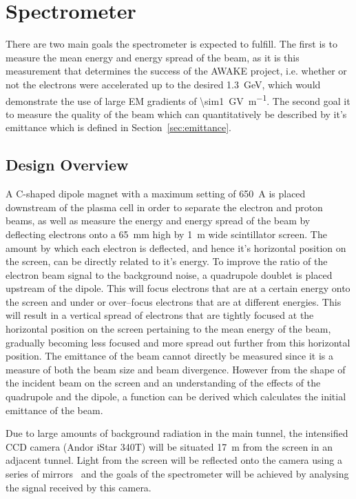 
\section{Spectrometer}
\label{sec:spectrometer}

There are two main goals the spectrometer is expected to fulfill. The first is
to measure the mean energy and energy spread of the beam, as it is this
measurement that determines the success of the AWAKE project, i.e.  whether or
not the electrons were accelerated up to the desired
\SI{1.3}{\giga\electronvolt}, which would demonstrate the use of large EM
gradients of \SI{\sim1}{\giga\volt\per\meter}. The second goal it to measure the
quality of the beam which can quantitatively be described by it's emittance
which is defined in Section~\ref{sec:emittance}.


\subsection{Design Overview}

A C-shaped dipole magnet with a maximum setting of \SI{650}{\ampere} is placed
downstream of the plasma cell in order to separate the electron and proton
beams, as well as measure the energy and energy spread of the beam by deflecting
electrons onto a \SI{65}{\milli\meter} high by \SI{1}{\meter} wide scintillator
screen. The amount by which each electron is deflected, and hence it's
horizontal position on the screen, can be directly related to it's energy.  To
improve the ratio of the electron beam signal to the background noise, a
quadrupole doublet is placed upstream of the dipole.  This will focus electrons
that are at a certain energy onto the screen and under or over--focus electrons
that are at different energies. This will result in a vertical spread of
electrons that are tightly focused at the horizontal position on the screen
pertaining to the mean energy of the beam, gradually becoming less focused and
more spread out further from this horizontal position. The emittance of the beam
cannot directly be measured since it is a measure of both the beam size and beam
divergence. However from the shape of the incident beam on the screen and an
understanding of the effects of the quadrupole and the dipole, a function can be
derived which calculates the initial emittance of the beam.

Due to large amounts of background radiation in the main tunnel, the intensified
CCD camera (Andor iStar 340T) will be situated \SI{17}{\meter} from the screen
in an adjacent tunnel. Light from the screen will be reflected onto the camera
using a series of mirrors~\cite{deacon2016qjq} and the goals of the spectrometer
will be achieved by analysing the signal received by this camera.

